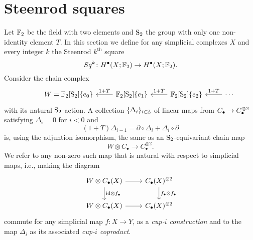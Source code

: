 
\section{Steenrod squares} \label{s:squares}

Let $\F_2$ be the field with two elements and $\S_2$ the group with only one non-identity element $T$.
In this section we define for any simplicial complexes $X$ and every integer $k$ the Steenrod $k^{\mathrm{th}}$ square
\begin{equation*}
Sq^k \colon H^\bullet(X; \F_2) \to H^{\bullet}(X; \F_2).
\end{equation*}
Consider the chain complex
\begin{equation*}
\begin{tikzcd}[column sep=normal]
& W =  \F_2[\S_2]\{e_0\} & \arrow[l, "1+T"'] \F_2[\S_2]\{e_1\} & \arrow[l, "1+T"']
\F_2[\S_2]\{e_2\} & \arrow[l, "1+T"'] \cdots
\end{tikzcd}
\end{equation*}
with its natural $\S_2$-action.
A collection $\{\Delta_i\}_{i \in \Z}$ of linear maps from $\chains \to \chains^{\otimes 2}$ satisfying $\Delta_i = 0$ for $i < 0$ and
\begin{equation*}
(1 + T) \Delta_{i-1} = \partial \circ \Delta_i + \Delta_i \circ \partial
\end{equation*}
is, using the adjuntion isomorphism, the same as an $\S_2$-equivariant chain map
\begin{equation} \label{e:steenrod diagonal}
W \otimes C_\bullet \to C_\bullet^{\otimes 2}.
\end{equation}
We refer to any non-zero such map that is natural with respect to simplicial maps, i.e., making the diagram
\begin{equation*}
\begin{tikzcd}
W \otimes \chains(X) \arrow[r] \arrow[d, "\id \otimes f_\bullet"] & \chains(X)^{\otimes 2} \arrow[d, "f_\bullet \otimes f_\bullet"] \\
W \otimes \chains(X) \arrow[r]& \chains(X)^{\otimes 2}
\end{tikzcd}
\end{equation*}
commute for any simplicial map $f \colon X \to Y$, as a \textit{cup-$i$ construction} and to the map $\Delta_i$ as its associated \textit{cup-$i$ coproduct}.

